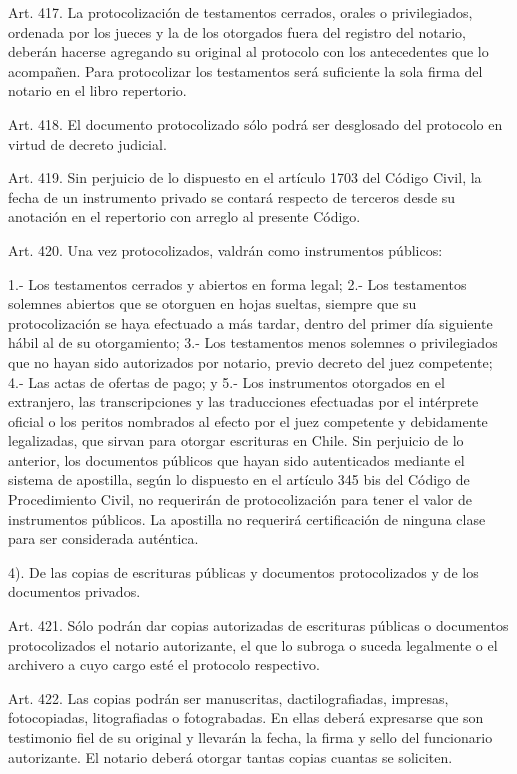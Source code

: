     Art. 417. La protocolización de testamentos cerrados, orales o privilegiados, ordenada por los jueces y la de los otorgados fuera del registro del notario, deberán hacerse agregando su original al protocolo con los antecedentes que lo acompañen.
    Para protocolizar los testamentos será suficiente la sola firma del notario en el libro repertorio.


    Art. 418. El documento protocolizado sólo podrá ser desglosado del protocolo en virtud de decreto judicial.


    Art. 419. Sin perjuicio de lo dispuesto en el artículo 1703 del Código Civil, la fecha de un instrumento privado se contará respecto de terceros desde su anotación en el repertorio con arreglo al presente Código.


    Art. 420. Una vez protocolizados, valdrán como instrumentos públicos:

    1.- Los testamentos cerrados y abiertos en forma legal;
    2.- Los testamentos solemnes abiertos que se otorguen en hojas sueltas, siempre que su protocolización se haya efectuado a más tardar, dentro del primer día siguiente hábil al de su otorgamiento;
    3.- Los testamentos menos solemnes o privilegiados que no hayan sido autorizados por notario, previo decreto del juez competente;
    4.- Las actas de ofertas de pago; y
    5.- Los instrumentos otorgados en el extranjero, las transcripciones y las traducciones efectuadas por el intérprete oficial o los peritos nombrados al efecto por el juez competente y debidamente legalizadas, que sirvan para otorgar escrituras en Chile.
    Sin perjuicio de lo anterior, los documentos públicos que hayan sido autenticados mediante el sistema de apostilla, según lo dispuesto en el artículo 345 bis del Código de Procedimiento Civil, no requerirán de protocolización para tener el valor de instrumentos públicos. La apostilla no requerirá certificación de ninguna clase para ser considerada auténtica.


    4). De las copias de escrituras públicas y documentos protocolizados y de los documentos privados.



    Art. 421. Sólo podrán dar copias autorizadas de escrituras públicas o documentos protocolizados el notario autorizante, el que lo subroga o suceda legalmente o el archivero a cuyo cargo esté el protocolo respectivo.


    Art. 422. Las copias podrán ser manuscritas, dactilografiadas, impresas, fotocopiadas, litografiadas o fotograbadas. En ellas deberá expresarse que son testimonio fiel de su original y llevarán la fecha, la firma y sello del funcionario autorizante. El notario deberá otorgar tantas copias cuantas se soliciten.



